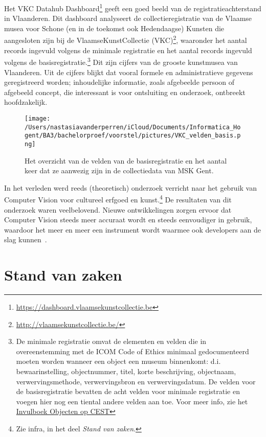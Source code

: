 Het VKC Datahub Dashboard\footnote{\url{https://dashboard.vlaamsekunstcollectie.be}} geeft een goed beeld van de registratieachterstand in Vlaanderen. Dit dashboard analyseert de collectieregistratie van de Vlaamse musea voor Schone (en in de toekomst ook Hedendaagse) Kunsten die aangesloten zijn bij de VlaamseKunstCollectie (VKC)\footnote{\url{http://vlaamsekunstcollectie.be/}}, waaronder het aantal records ingevuld volgens de minimale registratie en het aantal records ingevuld volgens de basisregistratie.\footnote{De minimale registratie omvat de elementen en velden die in overeenstemming met de ICOM Code of Ethics minimaal gedocumenteerd moeten worden wanneer een object een museum binnenkomt: d.i. bewaarinstelling, objectnummer, titel, korte beschrijving, objectnaam, verwervingsmethode, verwervingsbron en verwervingsdatum. De velden voor de basisregistratie bevatten de acht velden voor minimale registratie en voegen hier nog een tiental andere velden aan toe. Voor meer info, zie het \href{https://www.projectcest.be/wiki/Publicatie:Invulboek_objecten/Profielen/Basisregistratie}{Invulboek Objecten op CEST}} Dit zijn cijfers van de grooste kunstmusea van Vlaanderen. Uit de cijfers blijkt dat vooral formele en administratieve gegevens geregistreerd worden; inhoudelijke informatie, zoals afgebeelde persoon of afgebeeld concept, die interessant is voor ontsluiting en onderzoek, ontbreekt hoofdzakelijk.

\begin{figure}[h]
	\caption{Het overzicht van de velden van de basisregistratie en het aantal keer dat ze aanwezig zijn in de collectiedata van MSK Gent.}
	\centering
	\texttt{[image: /Users/nastasiavanderperren/iCloud/Documents/Informatica\_Hogent/BA3/bachelorproef/voorstel/pictures/VKC\_velden\_basis.png]}
\end{figure}

In het verleden werd reeds (theoretisch) onderzoek verricht naar het gebruik van Computer Vision voor cultureel erfgoed en kunst.\footnote{Zie infra, in het deel \emph{Stand van zaken}.} De resultaten van dit onderzoek waren veelbelovend. Nieuwe ontwikkelingen zorgen ervoor dat Computer Vision steeds meer accuraat wordt en steeds eenvoudiger in gebruik, waardoor het meer en meer een instrument wordt waarmee ook developers aan de slag kunnen~\autocite{Hindle2017}.


\section{Stand van zaken}
\label{sec:state-of-the-art}

